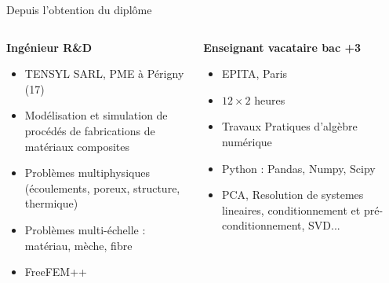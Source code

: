 \documentclass{beamer}
\begin{document}
\begin{frame}{Depuis l'obtention du diplôme}
\begin{columns}[t]
    \begin{column}{0.49\textwidth}
        \centering
        \textbf{Ingénieur R\&D}
        \vspace{15pt}
        \begin{itemize}
            \item TENSYL SARL, PME à Périgny (17)
            \item Modélisation et simulation de procédés de fabrications de matériaux composites
            \item Problèmes multiphysiques (écoulements, poreux, structure, thermique)
            \item Problèmes multi-échelle : matériau, mèche, fibre
            \item FreeFEM++
        \end{itemize}
    \end{column}
    \begin{column}{0.49\textwidth}
        \centering
        \textbf{Enseignant vacataire bac +3}
        \vspace{15pt}
        \begin{itemize}
            \item EPITA, Paris
            \item $12 \times 2$ heures
            \item Travaux Pratiques d'algèbre numérique
            \item Python : Pandas, Numpy, Scipy
            \item PCA, Resolution de systemes lineaires, conditionnement et pré-conditionnement, SVD...
        \end{itemize}
    \end{column}
\end{columns}
\end{frame}
\end{document}
